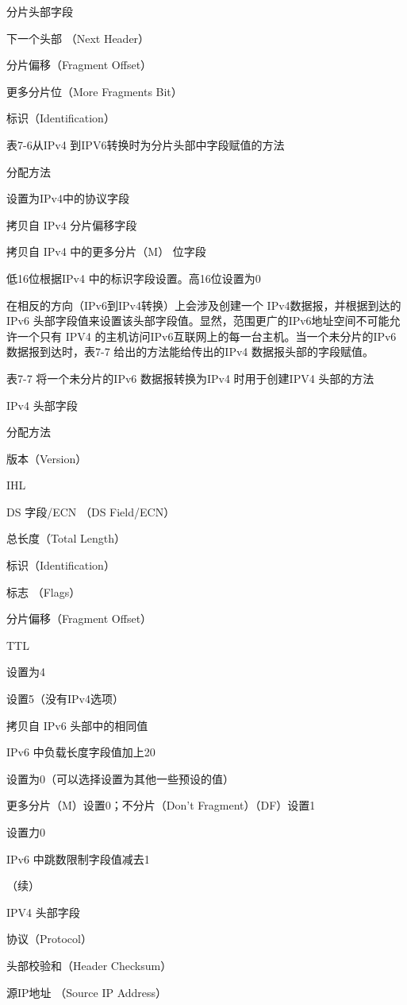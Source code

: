 分片头部字段

下一个头部 （Next Header）

分片偏移（Fragment Offset）

更多分片位（More Fragments Bit）

标识（Identification）

表7-6从IPv4 到IPV6转换时为分片头部中字段赋值的方法

分配方法

设置为IPv4中的协议字段

拷贝自 IPv4 分片偏移字段

拷贝自 IPv4 中的更多分片（M） 位字段

低16位根据IPv4 中的标识字段设置。高16位设置为0

在相反的方向（IPv6到IPv4转换）上会涉及创建一个 IPv4数据报，并根据到达的IPv6
头部字段值来设置该头部字段值。显然，范围更广的IPv6地址空间不可能允许一个只有
IPV4 的主机访问IPv6互联网上的每一台主机。当一个未分片的IPv6 数据报到达时，表7-7
给出的方法能给传出的IPv4 数据报头部的字段赋值。

表7-7 将一个未分片的IPv6 数据报转换为IPv4 时用于创建IPV4 头部的方法

IPv4 头部字段

分配方法

版本（Version）

IHL

DS 字段/ECN （DS Field/ECN）

总长度（Total Length）

标识（Identification）

标志 （Flags）

分片偏移（Fragment Offset）

TTL

设置为4

设置5（没有IPv4选项）

拷贝自 IPv6 头部中的相同值

IPv6 中负载长度字段值加上20

设置为0（可以选择设置为其他一些预设的值）

更多分片（M）设置0；不分片（Don't Fragment）（DF）设置1

设置力0

IPv6 中跳数限制字段值减去1

（续）

IPV4 头部字段

协议（Protocol）

头部校验和（Header Checksum）

源IP地址 （Source IP Address）

